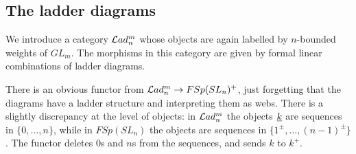 \documentclass[11pt,leqno]{article}
\begin{document}
\subsection{The ladder diagrams}

We introduce a category $ \mathcal{L}ad_n^m $ whose objects are again labelled by $n$-bounded weights of $ GL_m$.  The morphisms in this category are given by formal linear combinations of ladder diagrams.


There is an obvious functor from $\mathcal{L}ad_n^m \to FSp(SL_n)^+$, just forgetting that the diagrams have a ladder structure and interpreting them as webs. There is a slightly discrepancy at the level of objects: in $\mathcal{L}ad_n^m$ the objects ${\underline{k}}$ are sequences in $\{0,\ldots,n\}$, while in $FSp(SL_n)$ the objects are sequences in $\{1^\pm,\ldots,(n-1)^\pm\}$. The functor deletes $0$s and $n$s from the sequences, and sends $k$ to $k^+$.
\end{document}
